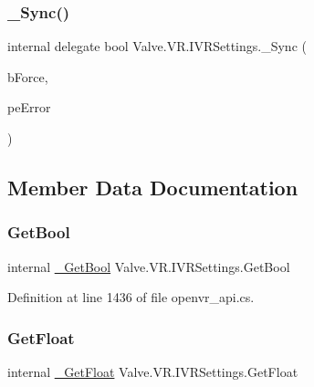 \mbox{\label{struct_valve_1_1_v_r_1_1_i_v_r_settings_a0d624461a28bfbc706c1d101a3b3eaf2}} 
\subsubsection{\texorpdfstring{\_Sync()}{\_Sync()}}
{\footnotesize\ttfamily internal delegate bool Valve.\+V\+R.\+I\+V\+R\+Settings.\+\_\+\+Sync (\begin{DoxyParamCaption}\item[{bool}]{b\+Force,  }\item[{ref \mbox{\hyperlink{namespace_valve_1_1_v_r_aeab7722b211afc3885ed77faa931291f}{E\+V\+R\+Settings\+Error}}}]{pe\+Error }\end{DoxyParamCaption})}



\subsection{Member Data Documentation}
\mbox{\label{struct_valve_1_1_v_r_1_1_i_v_r_settings_a3309a66faa1c3074016d2745be897d35}} 
\subsubsection{\texorpdfstring{GetBool}{GetBool}}
{\footnotesize\ttfamily internal \mbox{\hyperlink{struct_valve_1_1_v_r_1_1_i_v_r_settings_abaf963d85e971362f843cd98503893c6}{\+\_\+\+Get\+Bool}} Valve.\+V\+R.\+I\+V\+R\+Settings.\+Get\+Bool}



Definition at line 1436 of file openvr\+\_\+api.\+cs.

\mbox{\label{struct_valve_1_1_v_r_1_1_i_v_r_settings_a0890e0b3d7cce657ac63042c7118e831}} 
\subsubsection{\texorpdfstring{GetFloat}{GetFloat}}
{\footnotesize\ttfamily internal \mbox{\hyperlink{struct_valve_1_1_v_r_1_1_i_v_r_settings_a56022255db980ce1cdb32396f706c8b7}{\+\_\+\+Get\+Float}} Valve.\+V\+R.\+I\+V\+R\+Settings.\+Get\+Float}



